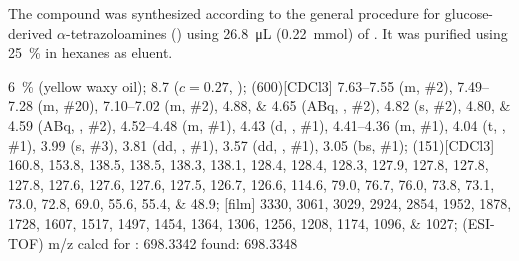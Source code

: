 The compound was synthesized according to the general procedure for glucose-derived $\alpha$-tetrazoloamines () using \SI{26.8}{\micro\liter} (\SI{0.22}{\milli\mol}) of .
It was purified using \SI{25}{\percent}  in hexanes as eluent.
\begin{fullexp}
	 \SI{6}{\percent} (yellow waxy oil); 
	\data{[$\alpha^{23}_D$]~$=$} \num{8.7} ($c = 0.27$, ); 
	\NMR(600)[CDCl3] \numrange{7.63}{7.55} (m, \#{2}), \numrange{7.49}{7.28} (m, \#{20}), \numrange{7.10}{7.02} (m, \#{2}), \numlist{4.88;4.65} (ABq, , \#{2}), \num{4.82} (s, \#{2}), \numlist{4.80;4.59} (ABq, , \#{2}), \numrange{4.52}{4.48} (m, \#{1}), \num{4.43} (d, , \#{1}), \numrange{4.41}{4.36} (m, \#{1}), \num{4.04} (t, , \#{1}), \num{3.99} (s, \#{3}), \num{3.81} (dd, , \#{1}), \num{3.57} (dd, , \#{1}), \num{3.05} (bs, \#{1}); 
	(151)[CDCl3] \numlist{160.8; 153.8; 138.5; 138.5; 138.3; 138.1; 128.4; 128.4; 128.3; 127.9; 127.8; 127.8; 127.8; 127.6; 127.6; 127.6; 127.5; 126.7; 126.6; 114.6; 79.0; 76.7; 76.0; 73.8; 73.1; 73.0; 72.8; 69.0; 55.6; 55.4; 48.9}; 
	[film] \numlist{3330; 3061; 3029; 2924; 2854; 1952; 1878; 1728; 1607; 1517; 1497; 1454; 1364; 1306; 1256; 1208; 1174; 1096; 1027}; 
	 (ESI-TOF) m/z calcd for : \num{698.3342} found: \num{698.3348}
\end{fullexp}

